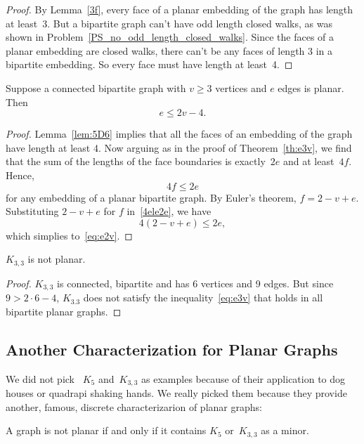 \begin{proof}
  By Lemma~\ref{3f}, every face of a planar embedding of the graph has
  length at least~3.  But a bipartite graph can't have odd length closed
  walks, as was shown in Problem~\ref{PS_no_odd_length_closed_walks}.
  Since the faces of a planar embedding are closed walks, there can't be
  any faces of length 3 in a bipartite embedding.   So every face must have
  length at least~4.
\end{proof}

\begin{theorem}\label{th:e2v}
Suppose a connected bipartite graph with $v \geq 3$ vertices and $e$ edges
is planar.  Then
\begin{equation}\label{eq:e2v}
    e \leq 2v-4.
\end{equation}
\end{theorem}

\begin{proof}
  Lemma~\ref{lem:5D6} implies that all the faces of an embedding of the
  graph have length at least 4.  Now arguing as in the proof of
  Theorem~\ref{th:e3v}, we find that the sum of the lengths of the face
  boundaries is exactly~$2e$ and at least~$4f$.  Hence,
\begin{equation}\label{4ele2e}
    4f \le 2e
\end{equation}
for any embedding of a planar bipartite graph.  By Euler's theorem,
$f=2-v+e$.  Substituting $2-v+e$ for $f$ in~\eqref{4ele2e}, we have
\[
4(2-v+e) \leq 2e,
\]
which simplies to~\eqref{eq:e2v}.
\end{proof}

\begin{corollary}\label{cor:K33-nonplanar} %
$K_{3, 3}$ is not planar.
\end{corollary}

\begin{proof}
  $K_{3,3}$ is connected, bipartite and has 6 vertices and 9 edges.  But
  since $ 9 > 2 \cdot 6-4$, $K_{3.3}$ does not satisfy the
  inequality~\eqref{eq:e3v} that holds in all bipartite planar graphs.
\end{proof}

\subsection{Another Characterization for Planar Graphs}

We did not pick ~$K_5$ and~$K_{3, 3}$ as examples because of their
application to dog houses or quadrapi shaking hands.  We really picked
them because they provide another, famous, discrete characterizarion
of planar graphs:
\begin{theorem}[Kuratowski]\label{thm:kuratowski}
A graph is not planar if and only if it contains $K_5$ or~$K_{3, 3}$
as a minor.
\end{theorem}

